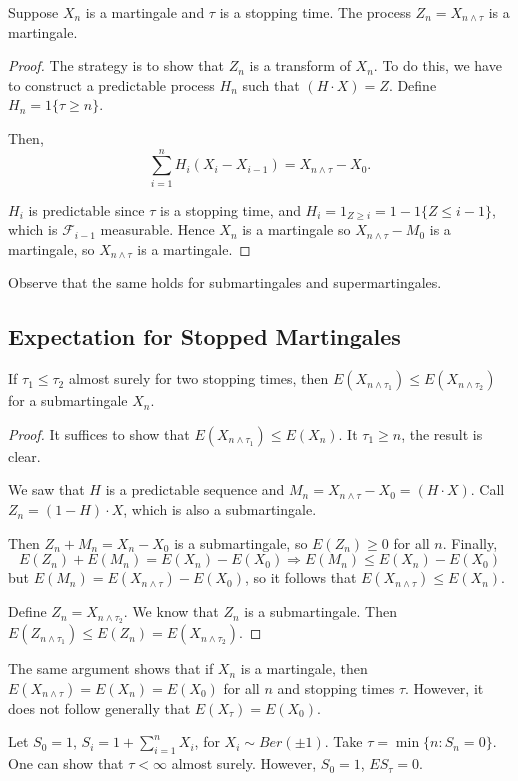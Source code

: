 \documentclass[11pt]{scrartcl}
\let \mc \mathcal
\begin{document}
\begin{thm} Suppose $X_n$ is a martingale and $\tau$ is a stopping time.  The process $Z_n = X_{n \wedge \tau}$ is a martingale.
\end{thm}
\begin{proof}
The strategy is to show that $Z_n$ is a transform of $X_n$.  To do this, we have to construct a predictable process $H_n$ such that $(H \cdot X) = Z$.  Define $H_n = 1\{\tau \ge n\}$. 

Then, 
$$\sum_{i=1}^n H_i(X_i - X_{i-1}) = X_{n \wedge \tau} - X_0.$$

$H_i$ is predictable since $\tau$ is a stopping time, and $H_i = 1_{Z \ge i} = 1 - 1\{Z \le i-1\}$, which is $\mc F_{i-1}$ measurable.  Hence $X_n$ is a martingale so $X_{n \wedge \tau} - M_0$ is a martingale, so $X_{n \wedge \tau}$ is a martingale.
\end{proof}
\begin{remark} Observe that the same holds for submartingales and supermartingales.
\end{remark}

\subsection{Expectation for Stopped Martingales}
\begin{lemma} If $\tau_1 \le \tau_2$ almost surely for two stopping times, then $E(X_{n \wedge \tau_1}) \le E(X_{n \wedge \tau_2})$ for a submartingale $X_n$.
\end{lemma}
\begin{proof}
It suffices to show that $E(X_{n \wedge \tau_1}) \le E(X_n)$.  It $\tau_1 \ge n$, the result is clear.  

We saw that $H$ is a predictable sequence and $M_n = X_{n \wedge \tau}  - X_0 = (H\cdot X)$.    Call $Z_n = (1 - H) \cdot X$, which is also a submartingale.  

Then $Z_n + M_n = X_n - X_0$ is a submartingale, so $E(Z_n) \ge 0$ for all $n$.  Finally, $$E(Z_n) + E(M_n) = E(X_n) - E(X_0) \Longrightarrow E(M_n) \le E(X_n) - E(X_0)$$
but $E(M_n) = E(X_{n \wedge \tau}) - E(X_0)$, so it follows that $E(X_{n \wedge \tau}) \le E(X_n)$.

Define $Z_n = X_{n \wedge \tau_2}$.  We know that $Z_n$ is a submartingale.  Then $E(Z_{n \wedge \tau_1}) \le E(Z_n) = E(X_{n \wedge \tau_2})$.
\end{proof}
\begin{remark} The same argument shows that if $X_n$ is a martingale, then $E(X_{n \wedge \tau}) = E(X_n) = E(X_0)$ for all $n$ and stopping times $\tau$.  However, it does not follow generally that $E(X_\tau) = E(X_0)$.
\end{remark}
\begin{example}  Let $S_0 = 1$, $S_i = 1 + \sum_{i=1}^n X_i$, for $X_i \sim Ber(\pm 1)$.  Take $\tau = \min\{n : S_n = 0\}$.  One can show that $\tau < \infty$ almost surely.  However, $S_0 = 1$, $ES_\tau = 0$.
\end{example}
\end{document}
